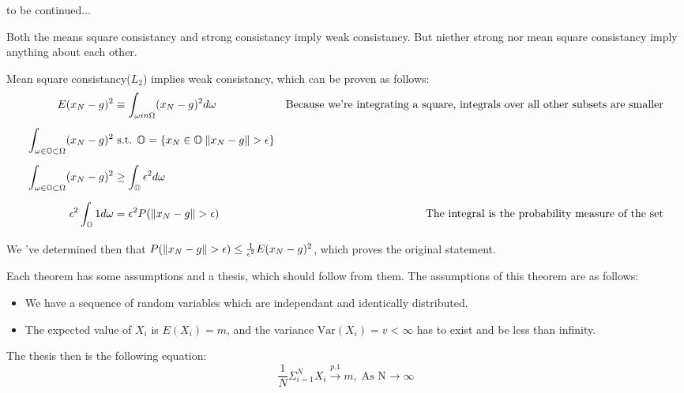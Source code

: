 {
    to be continued...

}


\nt
{
    Both the means square consistancy and strong consistancy imply weak consistancy. But niether strong nor mean square consistancy imply anything about each other.
}

\begin{myproof}
    Mean square consistancy($L_2$) implies weak consistancy, which can be proven as follows:\\
        \begin{equation}
            \begin{aligned}
                E(x_N-g)^{2}&\equiv \int_{\omega in \Omega}(x_N-g)^{2}d\omega&\mbox{Because we're integrating a square, integrals over all other subsets are smaller}\\[1.25ex]
                \int_{\omega \in \mathbb{O} \subset \Omega}(x_N-g)^{2}&\text{  s.t. }\mathbb{O} = \{x_N \in \mathbb{O} \: \lVert x_N-g\rVert > \epsilon \}&\mbox{}\\[1.25ex]
                \int_{\omega \in \mathbb{O} \subset \Omega}(x_N-g)^{2}&\ge \int_{\mathbb{O}}\epsilon^{2}d\omega&\mbox{}\\[1.25ex]
                \epsilon^{2}\int_{\mathbb{O}}1d\omega&=\epsilon^{2} P(\lVert x_N -g\rVert > \epsilon)&\mbox{The integral is the probability measure of the set}\\[1.25ex]
            \end{aligned}
        \end{equation}
        We 've determined then that $P(\lVert x_N -g\rVert > \epsilon) \le \frac{1}{\epsilon^{2}}E(x_N-g)^{2}$, which proves the original statement.
\end{myproof}


{
    Each theorem has some assumptions and a thesis, which should follow from them. The assumptions of this theorem are as follows:
    \begin{itemize}
            \item We have a sequence of random variables which are independant and identically distributed.
            \item The expected value of $X_i$ is $E(X_i) = m$, and the variance  $\text{Var}({X_i}) = v < \infty$ has to exist and be less than infinity.
    \end{itemize}
    The thesis then is the following equation:
    \begin{equation}
        \label{SLN_Kol}
        \frac{1}{N}\Sigma_{i=1}^{N}X_i \xrightarrow{p.1} m,\; \text{As N}\rightarrow \infty
    \end{equation}
}


